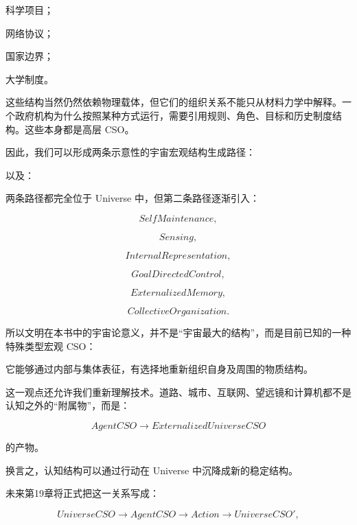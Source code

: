 科学项目；

网络协议；

国家边界；

大学制度。

这些结构当然仍然依赖物理载体，但它们的组织关系不能只从材料力学中解释。一个政府机构为什么按照某种方式运行，需要引用规则、角色、目标和历史制度结构。这些本身都是高层 CSO。

因此，我们可以形成两条示意性的宇宙宏观结构生成路径：

\begin{statementbox}
\centering
{}
\end{statementbox}

以及：

\begin{statementbox}
\centering
{}
\end{statementbox}

两条路径都完全位于 Universe 中，但第二条路径逐渐引入：

\[
SelfMaintenance,
\]

\[
Sensing,
\]

\[
InternalRepresentation,
\]

\[
GoalDirectedControl,
\]

\[
ExternalizedMemory,
\]

\[
CollectiveOrganization.
\]

所以文明在本书中的宇宙论意义，并不是“宇宙最大的结构”，而是目前已知的一种特殊类型宏观 CSO：

\begin{statementbox}
它能够通过内部与集体表征，有选择地重新组织自身及周围的物质结构。
\end{statementbox}

这一观点还允许我们重新理解技术。道路、城市、互联网、望远镜和计算机都不是认知之外的“附属物”，而是：

\[
AgentCSO
\rightarrow
ExternalizedUniverseCSO
\]

的产物。

换言之，认知结构可以通过行动在 Universe 中沉降成新的稳定结构。

未来第19章将正式把这一关系写成：

\[
UniverseCSO
\rightarrow
AgentCSO
\rightarrow
Action
\rightarrow
UniverseCSO',
\]

